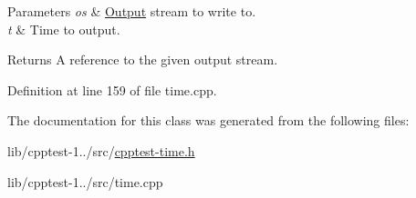 \begin{DoxyParams}{Parameters}
{\em os} & \hyperlink{class_test_1_1_output}{Output} stream to write to. \\
\hline
{\em t} & Time to output.\\
\hline
\end{DoxyParams}
\begin{DoxyReturn}{Returns}
A reference to the given output stream. 
\end{DoxyReturn}


Definition at line 159 of file time.\+cpp.



The documentation for this class was generated from the following files\+:\begin{DoxyCompactItemize}
\item 
lib/cpptest-\/1../src/\hyperlink{cpptest-time_8h}{cpptest-\/time.\+h}\item 
lib/cpptest-\/1../src/time.\+cpp\end{DoxyCompactItemize}
